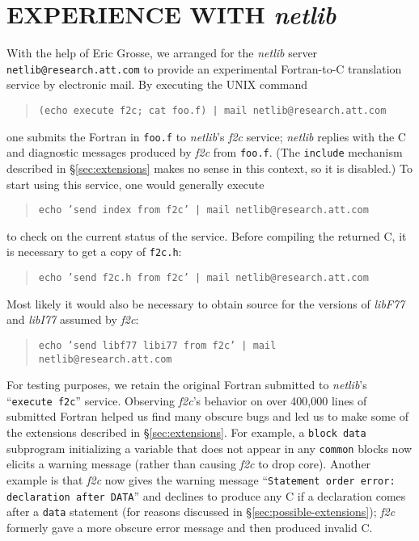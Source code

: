 \documentclass[10pt,a4paper]{article}
\begin{document}
\section{EXPERIENCE WITH \emph{netlib}} \label{sec:netlib}

With the help of Eric Grosse, we arranged for the \emph{netlib} \citep{5} server \texttt{netlib@research.att.com} to provide an experimental Fortran-to-C translation service by electronic mail. By executing the UNIX command
\begin{quote}
\begin{verbatim}
(echo execute f2c; cat foo.f) | mail netlib@research.att.com
\end{verbatim}
\end{quote}
one submits the Fortran in \verb|foo.f| to \emph{netlib}’s \emph{f2c} service; \emph{netlib} replies with the C and diagnostic messages produced by \emph{f2c} from \verb|foo.f|. (The \verb|include| mechanism described in §\ref{sec:extensions} makes no sense in this context, so it is disabled.) To start using this service, one would generally execute
\begin{quote}
\begin{verbatim}
echo ’send index from f2c’ | mail netlib@research.att.com
\end{verbatim}
\end{quote}
to check on the current status of the service. Before compiling the returned C, it is necessary to get a copy of \verb|f2c.h|:
\begin{quote}
\begin{verbatim}
echo ’send f2c.h from f2c’ | mail netlib@research.att.com
\end{verbatim}
\end{quote}
Most likely it would also be necessary to obtain source for the versions of \emph{libF77} and \emph{libI77} assumed by \emph{f2c}:
\begin{quote}
\begin{verbatim}
echo ’send libf77 libi77 from f2c’ | mail netlib@research.att.com
\end{verbatim}
\end{quote}

For testing purposes, we retain the original Fortran submitted to \emph{netlib}’s ``\verb|execute f2c|'' service. Observing \emph{f2c}’s behavior on over 400,000 lines of submitted Fortran helped us find many obscure bugs and led us to make some of the extensions described in §\ref{sec:extensions}. For example, a \verb|block data| subprogram initializing a variable that does not appear in any \verb|common| blocks now elicits a warning message (rather than causing \emph{f2c} to drop core). Another example is that \emph{f2c} now gives the warning message ``\texttt{Statement order error: declaration after DATA}'' and declines to produce any C if a declaration comes after a \verb|data| statement (for reasons discussed in §\ref{sec:possible-extensions}); \emph{f2c} formerly gave a more obscure error message and then produced invalid C.
\end{document}
